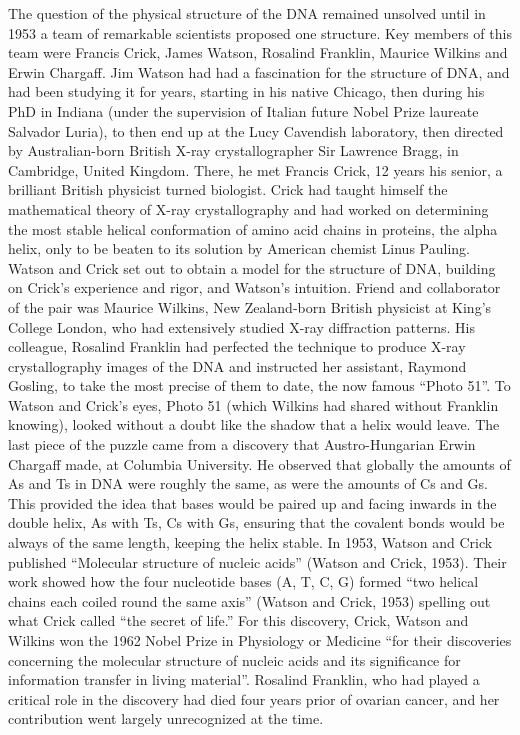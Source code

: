 The question of the physical structure of the DNA remained unsolved until in 1953 a team of remarkable scientists proposed one structure. 
Key members of this team were Francis Crick, James Watson, Rosalind Franklin, Maurice Wilkins and Erwin Chargaff. 
Jim Watson had had a fascination for the structure of DNA, and had been studying it for years, starting in his native Chicago, then during his PhD in Indiana (under the supervision of Italian future Nobel Prize laureate Salvador Luria), to then end up at the Lucy Cavendish laboratory, then directed by Australian-born British X-ray crystallographer Sir Lawrence Bragg, in Cambridge, United Kingdom. 
There, he met Francis Crick, 12 years his senior, a brilliant British physicist turned biologist. 
Crick had taught himself the mathematical theory of X-ray crystallography and had worked on determining the most stable helical conformation of amino acid chains in proteins, the alpha helix, only to be beaten to its solution by American chemist Linus Pauling. 
Watson and Crick set out to obtain a model for the structure of DNA, building on Crick’s experience and rigor, and Watson’s intuition. 
Friend and collaborator of the pair was Maurice Wilkins, New Zealand-born British physicist at King’s College London, who had extensively studied X-ray diffraction patterns. 
His colleague, Rosalind Franklin had perfected the technique to produce X-ray crystallography images of the DNA and instructed her assistant, Raymond Gosling, to take the most precise of them to date, the now famous “Photo 51”. 
To Watson and Crick’s eyes, Photo 51 (which Wilkins had shared without Franklin knowing), looked without a doubt like the shadow that a helix would leave. The last piece of the puzzle came from a discovery that Austro-Hungarian Erwin Chargaff made, at Columbia University. He observed that globally the amounts of As and Ts in DNA were roughly the same, as were the amounts of Cs and Gs. 
This provided the idea that bases would be paired up and facing inwards in the double helix, As with Ts, Cs with Gs, ensuring that the covalent bonds would be always of the same length, keeping the helix stable. 
In 1953, Watson and Crick published “Molecular structure of nucleic acids” (Watson and Crick, 1953). 
Their work showed how the four nucleotide bases (A, T, C, G) formed “two helical chains each coiled round the same axis” (Watson and Crick, 1953) spelling out what Crick called “the secret of life.” 
For this discovery, Crick, Watson and Wilkins won the 1962 Nobel Prize in Physiology or Medicine “for their discoveries concerning the molecular structure of nucleic acids and its significance for information transfer in living material”. 
Rosalind Franklin, who had played a critical role in the discovery had died four years prior of ovarian cancer, and her contribution went largely unrecognized at the time.



